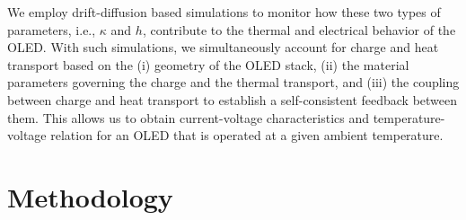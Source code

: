 \documentclass[%
9pt,
 aip,
rsi,%
 amsmath,amssymb,
preprint,%
]{revtex4-1}
\begin{document}
We employ drift-diffusion based simulations to monitor how these two types of parameters, i.e., $\kappa$ and $h$, contribute to the thermal and electrical behavior of the OLED.
With such simulations, we simultaneously account for charge and heat transport based on the (i) geometry of the OLED stack, (ii) the material parameters governing the charge and the thermal transport, and (iii) the coupling between charge and heat transport to establish a self-consistent feedback between them.
This allows us to obtain current-voltage characteristics and temperature-voltage relation for an OLED that is operated at a given ambient temperature. 






\section{Methodology}
\end{document}
